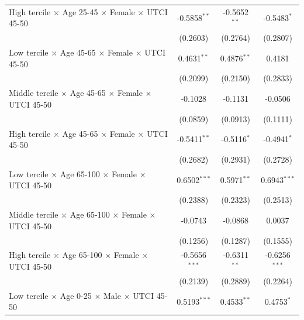 \begin{table}[htbp]
\begin{tabular}{lccc}
      High tercile $\times$ Age 25-45 $\times$ Female $\times$ UTCI 45-50       & -0.5858$^{**}$  & -0.5652$^{**}$    & -0.5483$^{*}$\\   
                                                                                & (0.2603)        & (0.2764)          & (0.2807)\\   
      Low tercile $\times$ Age 45-65 $\times$ Female $\times$ UTCI 45-50        & 0.4631$^{**}$   & 0.4876$^{**}$     & 0.4181\\   
                                                                                & (0.2099)        & (0.2150)          & (0.2833)\\   
      Middle tercile $\times$ Age 45-65 $\times$ Female $\times$ UTCI 45-50     & -0.1028         & -0.1131           & -0.0506\\   
                                                                                & (0.0859)        & (0.0913)          & (0.1111)\\   
      High tercile $\times$ Age 45-65 $\times$ Female $\times$ UTCI 45-50       & -0.5411$^{**}$  & -0.5116$^{*}$     & -0.4941$^{*}$\\   
                                                                                & (0.2682)        & (0.2931)          & (0.2728)\\   
      Low tercile $\times$ Age 65-100 $\times$ Female $\times$ UTCI 45-50       & 0.6502$^{***}$  & 0.5971$^{**}$     & 0.6943$^{***}$\\   
                                                                                & (0.2388)        & (0.2323)          & (0.2513)\\   
      Middle tercile $\times$ Age 65-100 $\times$ Female $\times$ UTCI 45-50    & -0.0743         & -0.0868           & 0.0037\\   
                                                                                & (0.1256)        & (0.1287)          & (0.1555)\\   
      High tercile $\times$ Age 65-100 $\times$ Female $\times$ UTCI 45-50      & -0.5656$^{***}$ & -0.6311$^{**}$    & -0.6256$^{***}$\\   
                                                                                & (0.2139)        & (0.2889)          & (0.2264)\\   
      Low tercile $\times$ Age 0-25 $\times$ Male $\times$ UTCI 45-50           & 0.5193$^{***}$  & 0.4533$^{**}$     & 0.4753$^{*}$\\   

\end{tabular}
\end{table}
